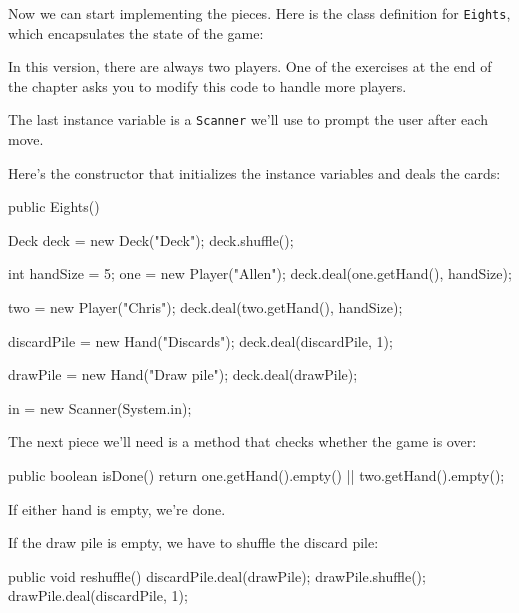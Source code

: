 \documentclass[12pt]{book}
\theoremstyle{exercise}
\newcommand{\java}[1]{\verb"#1"}
\newcommand{\java}[1]{\lstinline{#1}} %
\begin{document}
Now we can start implementing the pieces.
Here is the class definition for \java{Eights}, which encapsulates the state of the game:

\begin{code}
public class Eights {

    private Player one;
    private Player two;
    private Hand drawPile;
    private Hand discardPile;
    private Scanner in;
\end{code}

In this version, there are always two players.
One of the exercises at the end of the chapter asks you to modify this code to handle more players.

The last instance variable is a \java{Scanner} we'll use to prompt the user after each move.

Here's the constructor that initializes the instance variables and deals the cards:

\begin{code}
    public Eights() {
        Deck deck = new Deck("Deck");
        deck.shuffle();
        
        int handSize = 5;
        one = new Player("Allen");
        deck.deal(one.getHand(), handSize);

        two = new Player("Chris");
        deck.deal(two.getHand(), handSize);
        
        discardPile = new Hand("Discards");
        deck.deal(discardPile, 1);

        drawPile = new Hand("Draw pile");
        deck.deal(drawPile);

        in = new Scanner(System.in);
    }
\end{code}

The next piece we'll need is a method that checks whether the game is over:

\begin{code}
    public boolean isDone() {
        return one.getHand().empty() || two.getHand().empty();
    }
\end{code}

If either hand is empty, we're done.

If the draw pile is empty, we have to shuffle the discard pile:

\begin{code}
    public void reshuffle() {
        discardPile.deal(drawPile);
        drawPile.shuffle();
        drawPile.deal(discardPile, 1);
    }
\end{code}
\end{document}
